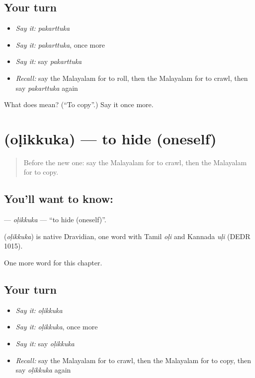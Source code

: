 \subsection*{Your turn}
\begin{itemize}
\raggedright
  \item \emph{Say it:} \emph{pakarttuka}
  \item \emph{Say it:} \emph{pakarttuka}, once more
  \item \emph{Say it:} say \emph{pakarttuka}
  \item \emph{Recall:} say the Malayalam for to roll, then the Malayalam for to crawl, then say \emph{pakarttuka} again
\end{itemize}

\begin{tcolorbox}[breakable,colback=teal!4,colframe=teal!35!black,title={Before you move on}]
What does  mean? (\textquotedblleft{}To copy\textquotedblright{}.) Say it once more.
\end{tcolorbox}
\section[\texorpdfstring{\ml{ഒളിക്കുക} (oḷikkuka)}{ഒളിക്കുക (oḷikkuka)}]{ (oḷikkuka) — to hide (oneself)}

\label{lesson:ML-C190-olikkuka2}



\begin{quote}
Before the new one: say the Malayalam for to crawl, then the Malayalam for to copy.
\end{quote}

\subsection*{You'll want to know: }
\textbf{} — \emph{oḷikkuka} — \textquotedblleft{}to hide (oneself)\textquotedblright{}.

\begin{cousinweb}
\textbf{} (\emph{oḷikkuka}) is native Dravidian, one word with Tamil \emph{oḷi} and Kannada \emph{uḷi} (DEDR 1015).
\end{cousinweb}

\begin{grammarlens}[title={What you've built}]
One more word for this chapter.
\end{grammarlens}

\subsection*{Your turn}
\begin{itemize}
\raggedright
  \item \emph{Say it:} \emph{oḷikkuka}
  \item \emph{Say it:} \emph{oḷikkuka}, once more
  \item \emph{Say it:} say \emph{oḷikkuka}
  \item \emph{Recall:} say the Malayalam for to crawl, then the Malayalam for to copy, then say \emph{oḷikkuka} again
\end{itemize}


